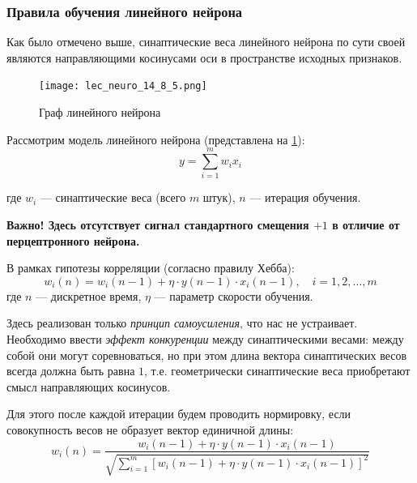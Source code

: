 \documentclass{article}
\numberwithin{equation}{subsection}
\begin{document}
\subsubsection{Правила обучения линейного нейрона}

Как было отмечено выше, синаптические веса линейного нейрона по сути своей являются 
направляющими косинусами оси в пространстве исходных признаков.

\begin{figure}[htbp]
    \centering
    \texttt{[image: lec\_neuro\_14\_8\_5.png]}
    \caption{Граф линейного нейрона}
    \label{lec_neuro_14_8_5}
\end{figure}

Рассмотрим модель линейного нейрона (представлена на \ref{lec_neuro_14_8_5}):
\begin{equation}
    y = \sum_{i=1}^m w_i x_i
\end{equation}

\noindent
где $w_i$ --- синаптические веса (всего $m$ штук), $n$ --- итерация обучения.

\begin{myquote}
    \textbf{Важно!
    Здесь отсутствует сигнал стандартного смещения $+1$ в отличие от перцептронного нейрона.}
\end{myquote}

В рамках гипотезы корреляции (согласно правилу Хебба):
\begin{equation}
    w_i (n) = w_i (n-1) + \eta \cdot y(n-1) \cdot x_i(n-1), \quad i=1, 2, \dots, m
\end{equation}
\noindent
где $n$ --- дискретное время, $\eta$ --- параметр скорости обучения.

Здесь реализован только \textit{принцип самоусиления}, что нас не устраивает. 
Необходимо ввести \textit{эффект конкуренции} между синаптическими весами: между собой они могут 
соревноваться, но при этом длина вектора синаптических весов всегда должна быть 
равна $1$, т.е. геометрически синаптические веса приобретают смысл направляющих косинусов.

Для этого после каждой итерации будем проводить нормировку, если совокупность весов не 
образует вектор единичной длины:
\begin{equation}
    w_i(n) = \dfrac{w_i(n-1) + \eta \cdot y(n-1) \cdot x_i(n-1)}
                   {\sqrt{\sum_{i=1}^{m} \left[ w_i(n-1) + \eta \cdot y(n-1) \cdot x_i(n-1) 
                                         \right] ^2}}
\end{equation}
\end{document}
